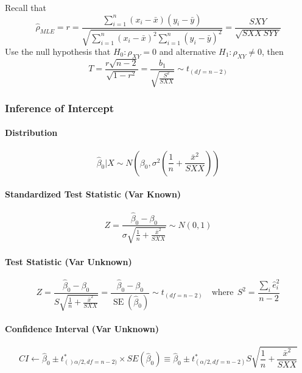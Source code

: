\documentclass[11pt]{article}
\begin{document}
Recall that 
\begin{equation*}
    \hat{\rho}_{MLE} = r=\frac{\sum_{i=1}^{n}\left(x_{i}-\bar{x}\right)\left(y_{i}-\bar{y}\right)}{\sqrt{\sum_{i=1}^{n}\left(x_{i}-\bar{x}\right)^{2} \sum_{i=1}^{n}\left(y_{i}-\bar{y}\right)^{2}}} = \frac{SXY}{\sqrt{SXX~SYY}}
\end{equation*}
Use the null hypothesis that $H_0: \rho_{XY} = 0$ and alternative $H_1: \rho_{XY} \neq 0$, then
\begin{equation*}
    T=\frac{r \sqrt{n-2}}{\sqrt{1-r^{2}}}=\frac{b_{1}}{\sqrt{\frac{S^{2}}{S X X}}} \sim t_{(df = n-2)}
\end{equation*}


\subsubsection{Inference of Intercept}
\paragraph{Distribution}
\begin{equation*}
    \hat{\beta}_{0} | X \sim N\left(\beta_{0}, \sigma^{2}\left(\frac{1}{n}+\frac{\bar{x}^{2}}{S X X}\right)\right)
\end{equation*}
\paragraph{Standardized Test Statistic (Var Known)}
\begin{equation*}
    Z=\frac{\hat{\beta}_{0}-\beta_{0}}{\sigma \sqrt{\frac{1}{n}+\frac{\bar{x}^{2}}{S X X}}} \sim N(0,1)
\end{equation*}
\paragraph{Test Statistic (Var Unknown)}
\begin{equation*}
    Z=\frac{\hat{\beta}_{0}-\beta_{0}}{S \sqrt{\frac{1}{n}+\frac{\bar{x}^{2}}{S X X}}} = \frac{\hat{\beta}_{0}-\beta_{0}}{\operatorname{SE}\left(\hat{\beta}_{0}\right)} \sim t_{(df=n-2)} \quad \text{where}~~ S^2 = \frac{\sum_i \hat{e}_i^2}{n-2} 
\end{equation*}
\paragraph{Confidence Interval (Var Unknown)}
\begin{equation*}
    CI \gets \hat{\beta}_0 \pm t^\ast_{()\alpha/2, df=n-2)} \times SE(\hat{\beta}_0) \equiv \hat{\beta}_0 \pm t^\ast_{(\alpha/2, df=n-2)} S\sqrt{\frac{1}{n}+\frac{\bar{x}^{2}}{S X X}}
\end{equation*}
\end{document}
